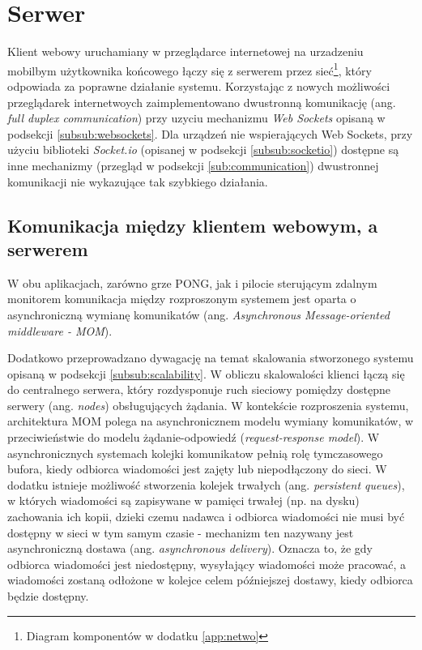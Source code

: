 \section{Serwer}

Klient webowy uruchamiany w przeglądarce internetowej na urzadzeniu mobilbym użytkownika końcowego łączy się z serwerem przez sieć\footnote{Diagram komponentów w dodatku \ref{app:netwo}}, który odpowiada za poprawne działanie systemu. Korzystając z nowych możliwości przeglądarek internetwoych zaimplementowano dwustronną komunikację (ang. \emph{full duplex communication}) przy uzyciu mechanizmu \emph{Web Sockets}\cite{websockets-rfc} opisaną w podsekcji \ref{subsub:websockets}. Dla urządzeń nie wspierających Web Sockets, przy użyciu biblioteki \emph{Socket.io} (opisanej w podsekcji \ref{subsub:socketio}) dostępne są inne mechanizmy (przegląd w podsekcji \ref{sub:communication}) dwustronnej komunikacji nie wykazujące tak szybkiego działania.

\subsection{Komunikacja między klientem webowym, a serwerem}
\label{sub:communication-methods}

W obu aplikacjach, zarówno grze PONG, jak i pilocie sterującym zdalnym monitorem komunikacja między rozproszonym systemem jest oparta o asynchroniczną wymianę komunikatów (ang. \emph{Asynchronous Message-oriented middleware - MOM})\cite{message-oriented-middleware}.

Dodatkowo przeprowadzano dywagację na temat skalowania stworzonego systemu opisaną w podsekcji \ref{subsub:scalability}. W obliczu skalowalości klienci łączą się do centralnego serwera, który rozdysponuje ruch sieciowy pomiędzy dostępne serwery (ang. \emph{nodes}) obsługujących żądania. W kontekście rozproszenia systemu, architektura MOM polega na asynchronicznem modelu wymiany komunikatów, w przeciwieństwie do modelu żądanie-odpowiedź (\emph{request-response model}). W asynchronicznych systemach kolejki komunikatow pełnią rolę tymczasowego bufora, kiedy odbiorca wiadomości jest zajęty lub niepodłączony do sieci. W dodatku istnieje możliwość stworzenia kolejek trwałych (ang. \emph{persistent queues}), w których wiadomości są zapisywane w pamięci trwałej (np. na dysku) zachowania ich kopii, dzieki czemu nadawca i odbiorca wiadomości nie musi być dostępny w sieci w tym samym czasie - mechanizm ten nazywany jest asynchroniczną dostawa (ang. \emph{asynchronous delivery}). Oznacza to, że gdy odbiorca wiadomości jest niedostępny, wysyłający wiadomości może pracować, a wiadomości zostaną odłożone w kolejce celem późniejszej dostawy, kiedy odbiorca będzie dostępny.

